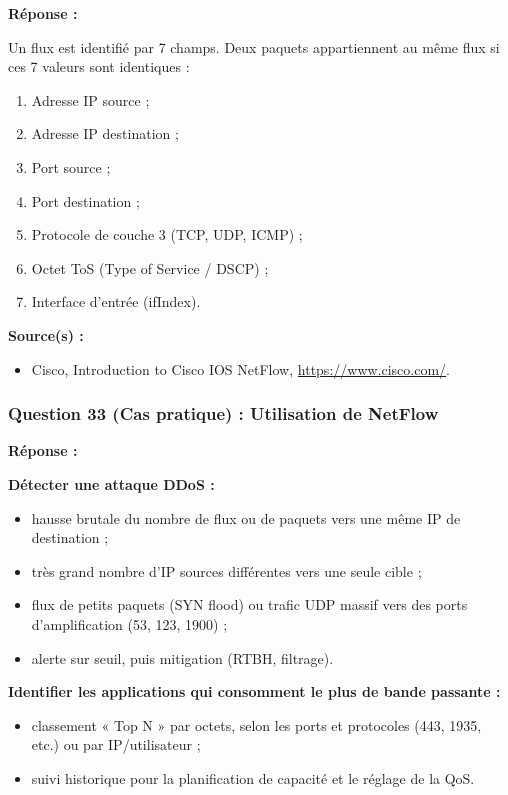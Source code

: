 \documentclass[12pt,a4paper]{article}
\newcommand{\reponse}{\textbf{Réponse :}\par}
\newcommand{\sources}{\textbf{Source(s) :}}
\begin{document}
\reponse
Un flux est identifié par 7 champs. Deux paquets appartiennent au même
flux si ces 7 valeurs sont identiques :
\begin{enumerate}
    \item Adresse IP source ;
    \item Adresse IP destination ;
    \item Port source ;
    \item Port destination ;
    \item Protocole de couche 3 (TCP, UDP, ICMP) ;
    \item Octet ToS (Type of Service / DSCP) ;
    \item Interface d'entrée (ifIndex).
\end{enumerate}

\sources
\begin{itemize}
    \item Cisco, Introduction to Cisco IOS NetFlow,
    \url{https://www.cisco.com/}.
\end{itemize}

\subsubsection*{Question 33 (Cas pratique) : Utilisation de NetFlow}

\reponse
\textbf{Détecter une attaque DDoS :}
\begin{itemize}
    \item hausse brutale du nombre de flux ou de paquets vers une même
    IP de destination ;
    \item très grand nombre d'IP sources différentes vers une seule
    cible ;
    \item flux de petits paquets (SYN flood) ou trafic UDP massif vers
    des ports d'amplification (53, 123, 1900) ;
    \item alerte sur seuil, puis mitigation (RTBH, filtrage).
\end{itemize}

\textbf{Identifier les applications qui consomment le plus de bande
passante :}
\begin{itemize}
    \item classement « Top N » par octets, selon les ports et protocoles
    (443, 1935, etc.) ou par IP/utilisateur ;
    \item suivi historique pour la planification de capacité et le
    réglage de la QoS.
\end{itemize}
\end{document}
